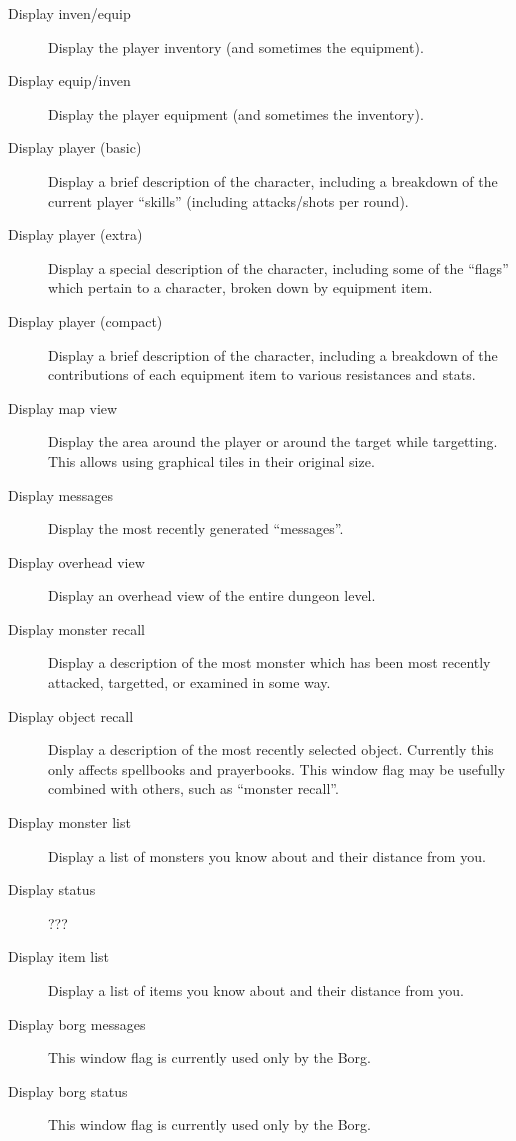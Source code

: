 \begin{description}
\item[Display inven/equip]
    Display the player inventory (and sometimes the equipment).

\item[Display equip/inven]
    Display the player equipment (and sometimes the inventory).

\item[Display player (basic)]
    Display a brief description of the character, including a breakdown
    of the current player ``skills'' (including attacks/shots per round).

\item[Display player (extra)]
    Display a special description of the character, including some of the
    ``flags'' which pertain to a character, broken down by equipment item.

\item[Display player (compact)]
    Display a brief description of the character, including a breakdown
    of the contributions of each equipment item to various resistances
    and stats.

\item[Display map view]
    Display the area around the player or around the target while
    targetting. This allows using graphical tiles in their original
    size.

\item[Display messages]
    Display the most recently generated ``messages''.

\item[Display overhead view]
    Display an overhead view of the entire dungeon level.

\item[Display monster recall]
    Display a description of the most monster which has been most recently
    attacked, targetted, or examined in some way.

\item[Display object recall]
    Display a description of the most recently selected object. Currently
    this only affects spellbooks and prayerbooks. This window flag may be
    usefully combined with others, such as ``monster recall''.

\item[Display monster list]
    Display a list of monsters you know about and their distance from you.

\item[Display status]
    ???

\item[Display item list]
    Display a list of items you know about and their distance from you.
 
\item[Display borg messages]
    This window flag is currently used only by the Borg.

\item[Display borg status]
    This window flag is currently used only by the Borg.
\end{description}

